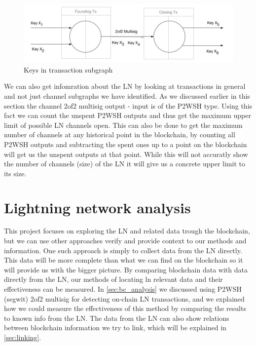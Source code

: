 \begin{figure}[h]
    \centering
    \includegraphics[width=14cm]{figures/keys_subgraph.png}
    \caption{Keys in transaction subgraph}
    \label{fig:keys_subgraphs}
\end{figure}

We can also get infomration about the LN by looking at transactions in general and not just channel subgraphs we have identified.
As we discussed earlier in this section the channel 2of2 multisig output - input is of the P2WSH type. Using this fact we can count the unspent P2WSH outputs and thus get the maximum upper limit of possible LN channels open. This can also be done to get the maximum number of channels at any historical point in the blockchain, by counting all P2WSH outputs and subtracting the spent ones up to a point on the blockchain will get us the unspent outputs at that point. While this will not accuratly show the number of channels (size) of the LN it will give us a concrete upper limit to its size.


\section{Lightning network analysis}
\label{sec:ln_analysis}

This project focuses on exploring the LN and related data trough the blockchain, but we can use other approaches verify and provide context to our methods and information. One such approach is simply to collect data from the LN directly. This data will be more complete than what we can find on the blockchain so it will provide us with the bigger picture. By comparing blockchain data with data directly from the LN, our methods of locating ln relevant data and their effectiveness can be measured. In \cref{sec:bc_analysis} we discussed using P2WSH (segwit) 2of2 multisig for detecting on-chain LN transactions, and we explained how we could measure the effectiveness of this method by comparing the results to known info from the LN. The data from the LN can also show relations between blockchain information we try to link, which will be explained in \cref{sec:linking}.
\\

